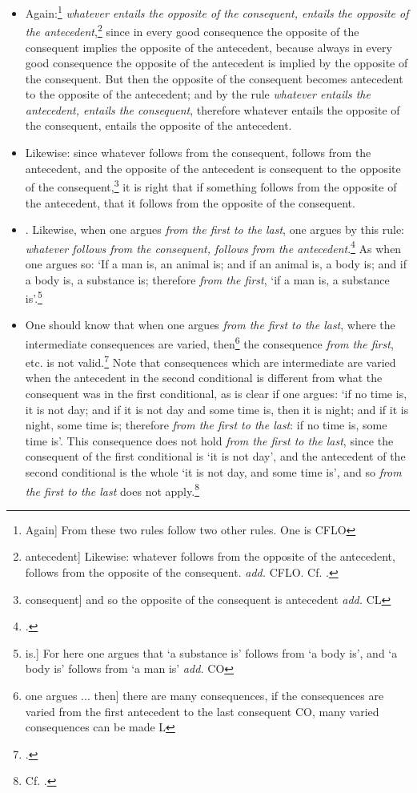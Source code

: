 \begin{itemize}
\item[5.] Again:\footnote{Again] From these two rules follow two other rules. One is CFLO} \textit{whatever entails the opposite of the consequent, entails the opposite of the antecedent},\footnote{antecedent] Likewise: whatever follows from the opposite of the antecedent, follows from the opposite of the consequent. \textit{add.} CFLO. Cf. \cite[p. 65.18]{BurleyDPAL}.} since in every good consequence the opposite of the consequent implies the opposite of the antecedent, because always in every good consequence the opposite of the antecedent is implied by the opposite of the consequent. But then the opposite of the consequent becomes antecedent to the opposite of the antecedent; and by the rule \textit{whatever entails the antecedent, entails the consequent}, therefore whatever entails the opposite of the consequent, entails the opposite of the antecedent.
\item[6.] Likewise: since whatever follows from the consequent, follows from the antecedent, and the opposite of the antecedent is consequent to the opposite of the consequent,\footnote{consequent] and so the opposite of the consequent is antecedent \textit{add.} CL}  it is right that if something follows from the opposite of the antecedent, that it follows from the opposite of the consequent.
\item[7.]. Likewise, when one argues \textit{from the first to the last}, one argues by this rule: \textit{whatever follows from the consequent, follows from the antecedent}.\footnote{\cite[p. 69.16; p. 200.20]{BurleyDPAL}.} As when one argues so: `If a man is, an animal is; and if an animal is, a body is; and if a body is, a substance is; therefore \textit{from the first}, `if a man is, a substance is'.\footnote{is.] For here one argues that `a substance is' follows from `a body is', and `a body is' follows from `a man is' \textit{add.} CO}
\item[8.] One should know that when one argues \textit{from the first to the last}, where the intermediate consequences are varied, then\footnote{one argues ... then] there are many consequences, if the consequences are varied from the first antecedent to the last consequent CO, many varied consequences can be made L} the consequence \textit{from the first}, etc. is not valid.\footnote{\cite[p. 70.1; p. 200.20]{BurleyDPAL}.} Note that consequences which are intermediate are varied when the antecedent in the second conditional is different from what the consequent was in the first conditional, as is clear if one argues: `if no time is, it is not day; and if it is not day and some time is, then it is night; and if it is night, some time is; therefore \textit{from the first to the last}: if no time is, some time is'. This consequence does not hold \textit{from the first to the last}, since the consequent of the first conditional is `it is not day', and the antecedent of the second conditional is the whole `it is not day, and some time is', and so \textit{from the first to the last} does not apply.\footnote{Cf. \cite[p. 7, par. 18]{Green-Pedersen1980a}.}

\end{itemize}
